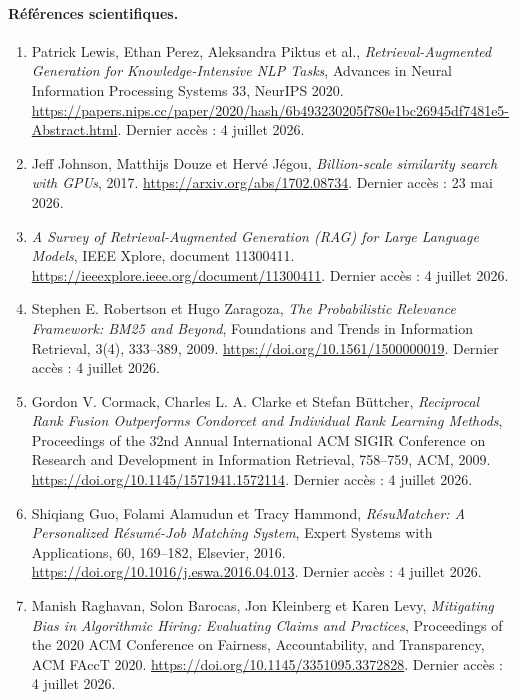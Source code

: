 \paragraph{Références scientifiques.}
\begin{enumerate}[resume]
  \item\label{web:rag-lewis} Patrick Lewis, Ethan Perez, Aleksandra Piktus et al., \textit{Retrieval-Augmented Generation for Knowledge-Intensive NLP Tasks}, Advances in Neural Information Processing Systems 33, NeurIPS 2020. \url{https://papers.nips.cc/paper/2020/hash/6b493230205f780e1bc26945df7481e5-Abstract.html}. Dernier accès : 4 juillet 2026.
  \item\label{web:vector-johnson} Jeff Johnson, Matthijs Douze et Hervé Jégou, \textit{Billion-scale similarity search with GPUs}, 2017. \url{https://arxiv.org/abs/1702.08734}. Dernier accès : 23 mai 2026.
  \item\label{web:rag-survey-ieee} \textit{A Survey of Retrieval-Augmented Generation (RAG) for Large Language Models}, IEEE Xplore, document 11300411. \url{https://ieeexplore.ieee.org/document/11300411}. Dernier accès : 4 juillet 2026.
  \item\label{web:bm25-robertson} Stephen E. Robertson et Hugo Zaragoza, \textit{The Probabilistic Relevance Framework: BM25 and Beyond}, Foundations and Trends in Information Retrieval, 3(4), 333--389, 2009. \url{https://doi.org/10.1561/1500000019}. Dernier accès : 4 juillet 2026.
  \item\label{web:rrf-cormack} Gordon V. Cormack, Charles L. A. Clarke et Stefan Büttcher, \textit{Reciprocal Rank Fusion Outperforms Condorcet and Individual Rank Learning Methods}, Proceedings of the 32nd Annual International ACM SIGIR Conference on Research and Development in Information Retrieval, 758--759, ACM, 2009. \url{https://doi.org/10.1145/1571941.1572114}. Dernier accès : 4 juillet 2026.
  \item\label{web:resumatcher} Shiqiang Guo, Folami Alamudun et Tracy Hammond, \textit{RésuMatcher: A Personalized Résumé-Job Matching System}, Expert Systems with Applications, 60, 169--182, Elsevier, 2016. \url{https://doi.org/10.1016/j.eswa.2016.04.013}. Dernier accès : 4 juillet 2026.
  \item\label{web:raghavan-hiring} Manish Raghavan, Solon Barocas, Jon Kleinberg et Karen Levy, \textit{Mitigating Bias in Algorithmic Hiring: Evaluating Claims and Practices}, Proceedings of the 2020 ACM Conference on Fairness, Accountability, and Transparency, ACM FAccT 2020. \url{https://doi.org/10.1145/3351095.3372828}. Dernier accès : 4 juillet 2026.

\end{enumerate}
